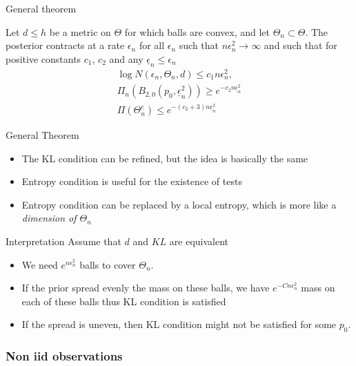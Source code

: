 \begin{frame}{General theorem}

\begin{theorem}
Let $d \leq h$ be a metric on $\Theta$ for which balls are convex, and let $\Theta_n \subset \Theta $. The posterior contracts at a rate $\epsilon_n$ for all $\epsilon_n$ such that $n\epsilon_n^2 \to \infty$ and such that for positive constants $c_1$, $c_2$ and any $\underline{\epsilon}_n \leq \epsilon_n$
\begin{align*}
\log N(\epsilon_n, \Theta_n, d) \leq c_1 n \epsilon_n^2, \\ 
\Pi_n(B_{2,0}(p_0,\underline{\epsilon}_n^2)) \geq e^{-c_2 n \underline{\epsilon}_n^2}\\
\Pi(\Theta_n^c) \leq e^{-(c_2+3)n \underline{\epsilon}_n^2}
\end{align*}
\end{theorem}

\end{frame}


\begin{frame}{General Theorem}
\begin{itemize}[<+->]
\item The KL condition can be refined, but the idea is basically the same
\item Entropy condition is useful for the existence of tests
\item Entropy condition can be replaced by a local entropy, which is more like a \emph{dimension of $\Theta_n$}
\end{itemize}
\pause 
\begin{block}{Interpretation}
Assume that $d$ and $KL$ are equivalent
\begin{itemize}[<+->]
\item We need $e^{n\epsilon_n^2}$ balls to cover $\Theta_n$. 
\item If the prior spread evenly the mass on these balls, we have $e^{-Cn\epsilon_n^2}$ mass on each of these balls thus KL condition is satisfied
\item If the spread is uneven, then KL condition might not be satisfied for some $p_0$. 
\end{itemize}
\end{block}
\end{frame}




\subsubsection[Non iid case]{Non iid  observations}




